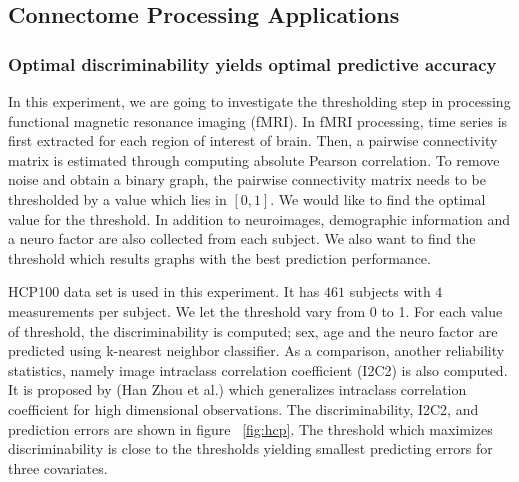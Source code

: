 \documentclass{article}
\begin{document}
\subsection{Connectome Processing Applications}

\subsubsection{Optimal discriminability yields optimal predictive accuracy}
In this experiment, we are going to investigate the thresholding step in processing functional magnetic resonance imaging (fMRI). In fMRI processing, time series is first extracted for each region of interest of brain. Then, a pairwise connectivity matrix is estimated through computing absolute Pearson correlation. To remove noise and obtain a binary graph, the pairwise connectivity matrix needs to be thresholded by a value which lies in $[0,1]$. We would like to find the optimal value for the threshold. In addition to neuroimages, demographic information and a neuro factor are also collected from each subject. We also want to find the threshold which results graphs with the best prediction performance.  

HCP100 data set is used in this experiment. It has $461$ subjects with $4$ measurements per subject. We let the threshold vary from 0 to 1. For each value of threshold, the discriminability is computed; sex, age and the neuro factor are predicted using k-nearest neighbor classifier. As a comparison, another reliability statistics, namely image intraclass correlation coefficient (I2C2) is also computed. It is proposed by (Han Zhou et al.) which generalizes intraclass correlation coefficient for high dimensional observations. The discriminability, I2C2, and prediction errors are shown in figure ~\ref{fig:hcp}. The threshold which maximizes discriminability is close to the thresholds yielding smallest predicting errors for three covariates. 
\end{document}
